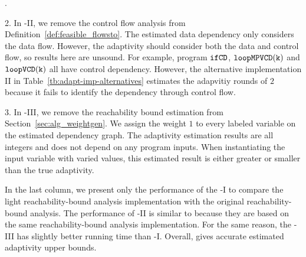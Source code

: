 .

2. In {\THESYSTEM}-II, we remove the control flow analysis from Definition~\ref{def:feasible_flowsto}.
The estimated data dependency only considers the data flow.
However, the adaptivity should consider both the data and control flow, so results here are unsound.
For example, program $\mathtt{ifCD}$, $ \mathtt{loopMPVCD(k)} $ and $\mathtt{loopVCD(k)} $ all have control dependency.
However, the alternative implementation II in Table~\ref{tb:adapt-imp-alternatives} estimates the adapvitiy rounds of $2$ because it fails to identify the dependency through control flow.


3. In {\THESYSTEM}-III, we remove the reachability bound estimation from Section~\ref{sec:alg_weightgen}.
We assign the weight $1$ to every labeled variable on the estimated dependency graph.
The adaptivity estimation results are all integers and does not depend on any program inputs.
When instantiating the input variable with varied values, this estimated result is either greater or smaller than the true adaptivity.

In the last column, we present only the performance of the {\THESYSTEM}-I to compare the
light reachability-bound analysis implementation with the original reachability-bound analysis.
The performance of {\THESYSTEM}-II is similar to {\THESYSTEM} because they are based on the same
reachability-bound analysis implementation. For the same reason, the {\THESYSTEM}-III has slightly better
running time than {\THESYSTEM}-I.
Overall, {\THESYSTEM} gives accurate estimated
adaptivity upper bounds.



